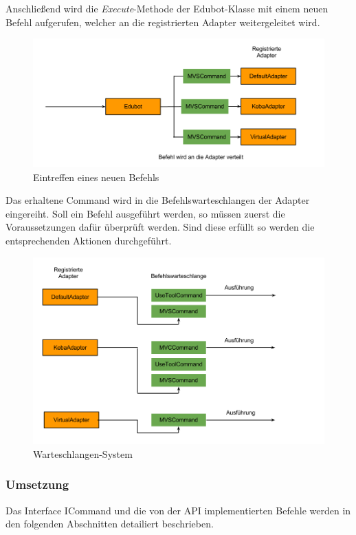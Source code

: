 Anschließend wird die \textit{Execute}-Methode der Edubot-Klasse mit einem neuen Befehl aufgerufen, welcher an die registrierten Adapter weitergeleitet wird.
\begin{figure}[H]
  \centering
  \begin{minipage}[t]{12 cm}
  	\centering
  	\includegraphics[width=12cm]{images/CommandSystem2} 
    \caption{Eintreffen eines neuen Befehls}
  \end{minipage}
\end{figure}
Das erhaltene Command wird in die Befehlswarteschlangen der Adapter eingereiht. Soll ein Befehl ausgeführt werden, so müssen zuerst die Voraussetzungen dafür überprüft werden. Sind diese erfüllt so werden die entsprechenden Aktionen durchgeführt.
\begin{figure}[H]
  \centering
  \begin{minipage}[t]{12 cm}
  	\centering
  	\includegraphics[width=12cm]{images/CommandSystem3} 
    \caption{Warteschlangen-System}
  \end{minipage}
\end{figure}

\subsubsection{Umsetzung}
Das Interface ICommand und die von der API implementierten Befehle werden in den folgenden Abschnitten detailiert beschrieben.

